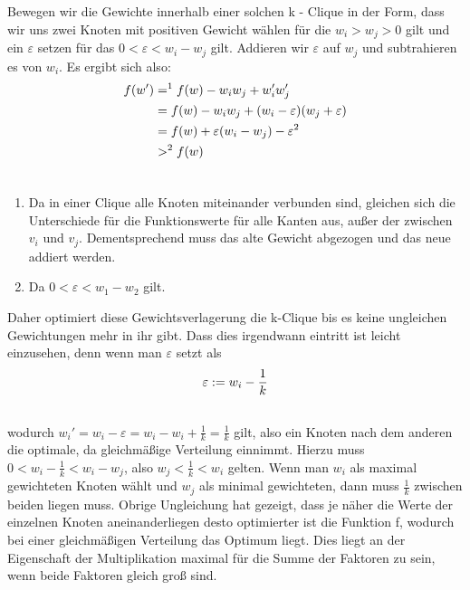 \documentclass[12pt, a4paper]{article}
\begin{document}
Bewegen wir die Gewichte innerhalb einer solchen k - Clique in der Form, dass wir uns zwei Knoten mit positiven Gewicht wählen für die $w_i > w_j > 0$ gilt und ein $\varepsilon$ setzen für das $0 < \varepsilon < w_i - w_j$ gilt. Addieren wir $\varepsilon$ auf $w_j$ und subtrahieren es von $w_i$. Es ergibt sich also:
\begin{gather}
\begin{split}f(w') &=^1 f(w) - w_i w_j + w'_i w'_j \\
&= f(w) - w_i w_j + (w_i - \varepsilon)(w_j + \varepsilon) \\
&= f(w) + \varepsilon (w_i - w_j) - \varepsilon^2 \\
&>^2 f(w)\end{split}\notag\\\begin{split}\end{split}\notag
\end{gather}\begin{enumerate}
\item {} 
Da in einer Clique alle Knoten miteinander verbunden sind, gleichen sich die Unterschiede für die Funktionswerte für alle Kanten aus, außer der zwischen $v_i$ und $v_j$. Dementsprechend muss das alte Gewicht abgezogen und das neue addiert werden.

\item {} 
Da $0 < \varepsilon < w_1 - w_2$ gilt.

\end{enumerate}

Daher optimiert diese Gewichtsverlagerung die k-Clique bis es keine ungleichen Gewichtungen mehr in ihr gibt.
Dass dies irgendwann eintritt ist leicht einzusehen, denn wenn man $\varepsilon$ setzt als
\begin{gather}
\begin{split}\varepsilon := w_i - \frac{1}{k}\end{split}\notag\\\begin{split}\end{split}\notag
\end{gather}
wodurch $w_i' = w_i - \varepsilon = w_i - w_i + \frac{1}{k} = \frac{1}{k}$ gilt, also ein Knoten nach dem anderen die optimale, da gleichmäßige Verteilung einnimmt. Hierzu muss $0 < w_i - \frac{1}{k} < w_i - w_j$, also $w_j < \frac{1}{k} < w_i$ gelten. Wenn man $w_i$ als maximal gewichteten Knoten wählt und $w_j$ als minimal gewichteten, dann muss $\frac{1}{k}$ zwischen beiden liegen muss. Obrige Ungleichung hat gezeigt, dass je näher die Werte der einzelnen Knoten aneinanderliegen desto optimierter ist die Funktion f, wodurch bei einer gleichmäßigen Verteilung das Optimum liegt. Dies liegt an der Eigenschaft der Multiplikation maximal für die Summe der Faktoren zu sein, wenn beide Faktoren gleich groß sind.
\end{document}
